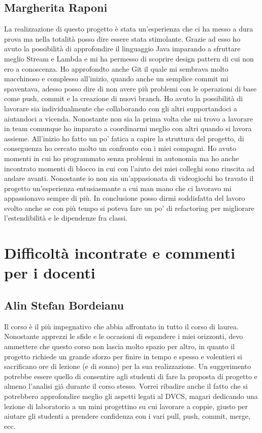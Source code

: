 \documentclass[a4paper,12pt]{report}
\begin{document}
\subsection{Margherita Raponi}
La realizzazione di questo progetto è stata un'esperienza che ci ha messo a dura prova ma nella totalità posso dire essere stata stimolante. Grazie ad esso ho avuto la possibilità di approfondire il linguaggio Java imparando a sfruttare meglio Stream e Lambda e mi ha permesso di scoprire design pattern di cui non ero a conoscenza. Ho approfondto anche Git il quale mi sembrava molto macchinoso e complesso all'inizio, quando anche un semplice commit mi spaventava, adesso posso dire di non avere più problemi con le operazioni di base come push, commit e la creazione di nuovi branch. Ho avuto la possibilità di lavorare sia individualmente che collaborando con gli altri supportandoci a aiutandoci a vicenda. Nonostante non sia la prima volta che mi trovo a lavorare in team comunque ho imparato a coordinarmi meglio con altri quando si lavora assieme. All'inizio ho fatto un po' fatica a capire la struttura del progetto, di conseguenza ho cercato molto un confronto con i miei compagni. Ho avuto momenti in cui ho programmato senza problemi in autonomia ma ho anche incontrato momenti di blocco in cui con l'aiuto dei miei colleghi sono riuscita ad andare avanti. Nonostante io non sia un'appasionata di videogiochi ho travato il progetto un'esperienza entusiasmante a cui man mano che ci lavoravo mi appassionavo sempre di più. In conclusione posso dirmi soddisfatta del lavoro svolto anche se con più tempo si poteva fare un po' di refactoring per migliorare l'estendibilità e le dipendenze fra classi. 

\section{Difficoltà incontrate e commenti per i docenti}

\subsection{Alin Stefan Bordeianu}
Il corso è il più impegnativo che abbia affrontato in tutto il corso di laurea. Nonostante apprezzi le sfide e le occasioni di espandere i miei orizzonti, devo ammettere che questo corso non lascia molto spazio per altro, in quanto il progetto richiede un grande sforzo per finire in tempo e spesso e volentieri si sacrificano ore di lezione (e di sonno) per la sua realizzazione. Un suggerimento potrebbe essere quello di consentire agli studenti di fare la proposta di progetto e almeno l'analisi già durante il corso stesso. Vorrei ribadire anche il fatto che si potrebbero approfondire meglio gli aspetti legati al DVCS, magari dedicando una lezione di laboratorio a un mini progettino su cui lavorare a coppie, giusto per aiutare gli studenti a prendere confidenza con i vari pull, push, commit, merge, ecc.
\end{document}
